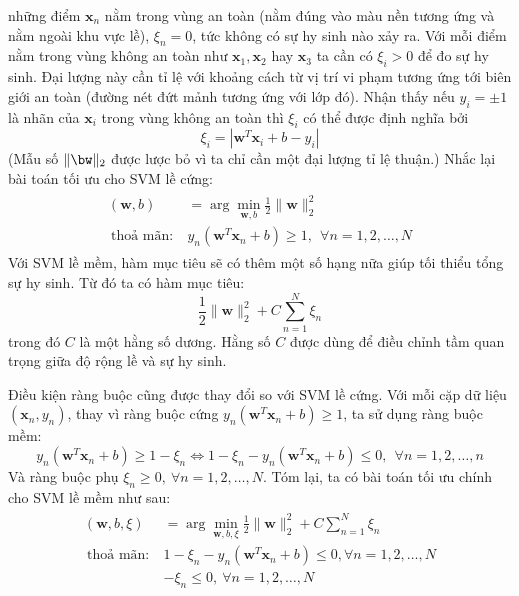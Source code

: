 những điểm $\mathbf{x}_n$ nằm trong {vùng an toàn} (nằm đúng vào màu nền
tương ứng và nằm ngoài khu vực lề), $\xi_n = 0$, tức không có sự
{hy sinh} nào xảy ra. Với mỗi điểm nằm trong {vùng không
an toàn} như $\mathbf{x}_1,
\mathbf{x}_2$ hay $\mathbf{x}_3$ ta cần có $\xi_i > 0$ để đo sự hy sinh. Đại lượng này cần tỉ lệ với khoảng cách từ vị trí vi phạm tương ứng tới
biên giới an toàn (đường nét đứt mảnh tương ứng với lớp đó). Nhận thấy nếu $y_i= \pm 1$ là {nhãn} của
$\mathbf{x}_i$ trong {vùng không an toàn} thì $\xi_i$ có thể được định
nghĩa bởi
\begin{equation}
    \xi_i = |\mathbf{w}^T\mathbf{x}_i + b - y_i|
\end{equation}
(Mẫu số $\|\bw\|_2$ được lược bỏ vì ta chỉ cần một đại lượng tỉ lệ thuận.)
Nhắc lại bài toán tối ưu cho SVM lề cứng: 
\begin{eqnarray}  
\label{eqn:20_1}
\begin{aligned}
    (\mathbf{w}, b) &= \arg \min_{\mathbf{w}, b} \frac{1}{2}{\|\mathbf{w}\|_2^2}   \\\ 
    \text{thoả mãn:}~ & y_n(\mathbf{w}^T\mathbf{x}_n + b) \geq 1, ~~\forall n = 1, 2, \dots, N 
\end{aligned}
\end{eqnarray} 
Với SVM lề mềm, hàm mục tiêu sẽ có thêm một số hạng nữa giúp tối
thiểu {tổng sự hy sinh}. Từ đó ta có hàm mục tiêu:
\begin{equation} 
\frac{1}{2}{\|\mathbf{w}\|_2^2} + C \sum_{n=1}^N \xi_n 
\end{equation} 
trong đó $C$ là một hằng số dương. Hằng số $C$ được dùng để điều chỉnh tầm quan trọng giữa độ rộng lề và
sự hy sinh. 

Điều kiện ràng buộc cũng được thay đổi so với SVM lề cứng. Với mỗi cặp dữ liệu $(\mathbf{x}_n,
y_n)$, thay vì ràng buộc {cứng} $y_n(\mathbf{w}^T\mathbf{x}_n + b) \geq
1$, ta sử dụng ràng buộc {mềm}:  
\begin{equation*} 
y_n(\mathbf{w}^T\mathbf{x}_n + b) \geq 1 - \xi_n \Leftrightarrow 1 - \xi_n - y_n(\mathbf{w}^T\mathbf{x}_n + b) \leq 0, ~~ \forall n = 1, 2, \dots, n 
\end{equation*} 
Và ràng buộc phụ $\xi_n \geq 0, ~\forall n = 1, 2, \dots, N$. 
Tóm lại, ta có bài toán tối ưu chính cho SVM lề mềm
như sau: 
\begin{eqnarray}  
\label{eqn:20_2}
\begin{aligned}
    (\mathbf{w}, b, \xi) &= \arg \min_{\mathbf{w}, b, \xi} \frac{1}{2}{\|\mathbf{w}\|_2^2} + C \sum_{n=1}^N \xi_n  \\\ 
    \text{thoả mãn:}~ & 1 - \xi_n - y_n(\mathbf{w}^T\mathbf{x}_n + b) \leq 0, \forall n = 1, 2, \dots, N  \\\ 
    & -\xi_n \leq 0,  ~\forall n = 1, 2, \dots, N 
\end{aligned}
\end{eqnarray} 
 
